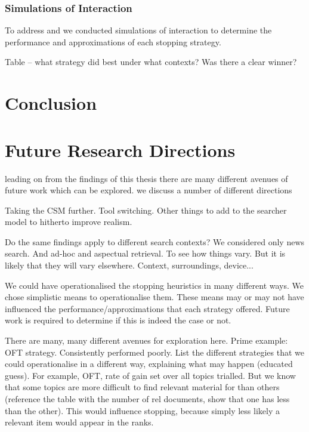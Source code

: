 \subsubsection{Simulations of Interaction}
To address  and  we conducted simulations of interaction to determine the performance and approximations of each stopping strategy. 

Table -- what strategy did best under what contexts?
Was there a clear winner?




\section{Conclusion}

\section{Future Research Directions}
leading on from the findings of this thesis there are many different avenues of future work which can be explored.
we discuss a number of different directions 

Taking the CSM further. Tool switching. Other things to add to the searcher model to hitherto improve realism.

Do the same findings apply to different search contexts? We considered only news search. And ad-hoc and aspectual retrieval. To see how things vary. But it is likely that they will vary elsewhere. Context, surroundings, device...


We could have operationalised the stopping heuristics in many different ways. We chose simplistic means to operationalise them. These means may or may not have influenced the performance/approximations that each strategy offered. Future work is required to determine if this is indeed the case or not.

There are many, many different avenues for exploration here. Prime example: OFT strategy. Consistently performed poorly. List the different strategies that we could operationalise in a different way, explaining what may happen (educated guess).
For example, OFT, rate of gain set over all topics trialled. But we know that some topics are more difficult to find relevant material for than others (reference the table with the number of rel documents, show that one has less than the other). This would influence stopping, because simply less likely a relevant item would appear in the ranks.

